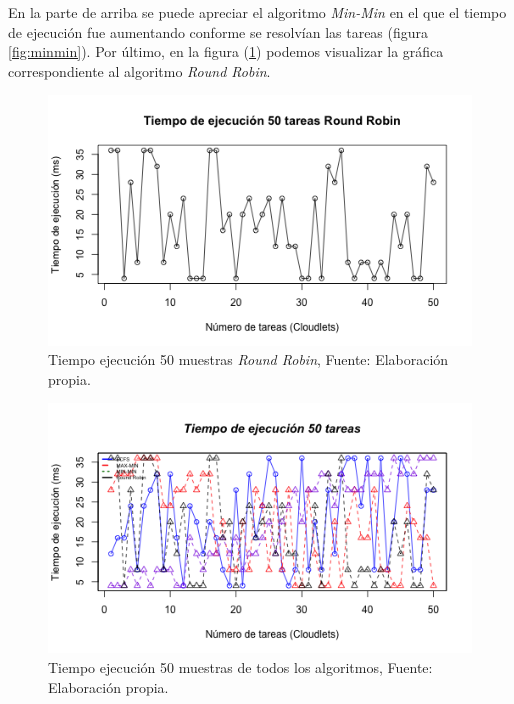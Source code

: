 En la parte de arriba se puede apreciar el algoritmo \textit{Min-Min} en el que el tiempo de ejecuci\'on fue aumentando conforme se resolv\'ian las tareas (figura \ref{fig:minmin}). Por último, en la figura (\ref{fig:roundrobin}) podemos visualizar la gráfica correspondiente al algoritmo \textit{Round Robin}.

\setcounter{figure}{22}
\renewcommand\thefigure{\arabic{figure}}
\begin{figure}[h!] 
	\centering
	\includegraphics[scale=0.6]{media/roundrobin}
	\caption{Tiempo ejecuci\'on 50 muestras \textit{Round Robin}, Fuente: Elaboraci\'on propia.}
	\label{fig:roundrobin}
\end{figure}

\newpage



\setcounter{figure}{23}
\renewcommand\thefigure{\arabic{figure}}
\begin{figure}[h!] 
	\centering
	\includegraphics[scale=0.7]{media/figure}
	\caption{Tiempo ejecuci\'on 50 muestras de todos los algoritmos, Fuente: Elaboraci\'on propia.}
	\label{fig:figure}
\end{figure}

